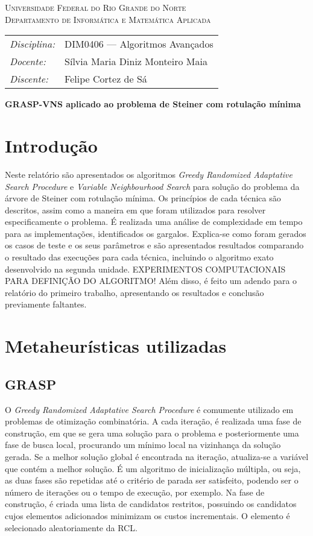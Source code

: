 \documentclass[12pt, a4paper]{article}
\begin{document}
\begin{center}
    \textsc{Universidade Federal do Rio Grande do Norte} \\
    \textsc{Departamento de Informática e Matemática Aplicada}
\end{center}

\bigskip

\begin{tabular}{@{}ll@{}}
    \emph{Disciplina:} & DIM0406 --- Algoritmos Avançados \\
    \emph{Docente:}    & Sílvia Maria Diniz Monteiro Maia \\
    \emph{Discente:}   & Felipe Cortez de Sá \\
\end{tabular}

\bigskip

\begin{center}
\large \textbf{GRASP-VNS aplicado ao problema de Steiner com rotulação mínima}
\end{center}

\section{Introdução}
Neste relatório são apresentados os algoritmos \emph{Greedy Randomized
Adaptative Search Procedure} e \emph{Variable Neighbourhood Search} para
solução do problema da árvore de Steiner com rotulação mínima. Os princípios de
cada técnica são descritos, assim como a maneira em que foram utilizados para
resolver especificamente o problema. É realizada uma análise de complexidade em
tempo para as implementações, identificados os gargalos. Explica-se como foram
gerados os casos de teste e os seus parâmetros e são apresentados resultados
comparando o resultado das execuções para cada técnica, incluindo o algoritmo
exato desenvolvido na segunda unidade. EXPERIMENTOS COMPUTACIONAIS PARA
DEFINIÇÃO DO ALGORITMO! Além disso, é feito um adendo para o relatório do
primeiro trabalho, apresentando os resultados e conclusão previamente
faltantes.

\section{Metaheurísticas utilizadas}
\subsection{GRASP}
O \emph{Greedy Randomized Adaptative Search Procedure} é comumente utilizado em
problemas de otimização combinatória. A cada iteração, é realizada uma fase de
construção, em que se gera uma solução para o problema e posteriormente uma
fase de busca local, procurando um mínimo local na vizinhança da solução
gerada. Se a melhor solução global é encontrada na iteração, atualiza-se a
variável que contém a melhor solução. É um algoritmo de inicialização múltipla,
ou seja, as duas fases são repetidas até o critério de parada ser satisfeito,
podendo ser o número de iterações ou o tempo de execução, por exemplo. Na fase
de construção, é criada uma lista de candidatos restritos, possuindo os
candidatos cujos elementos adicionados minimizam os custos incrementais. O
elemento é selecionado aleatoriamente da RCL.
\end{document}
